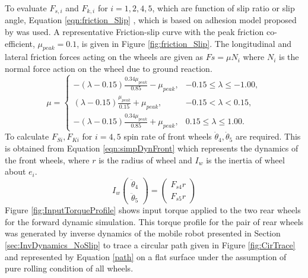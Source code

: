 To evaluate $F_{s,i} $ and $F_{k,i}$ for $i=1,2,4,5$,   which are function of  slip ratio or slip angle,  Equation \ref{eqn:friction_Slip}  \cite{balakrishna1995modeling}, which is based on adhesion model proposed by \cite{dugoff1970analysis} was used.  A representative Friction-slip curve with the peak friction co-efficient, $\mu_{peak}=0.1$, is given in  Figure \ref{fig:friction_Slip}. The longitudinal and lateral friction forces acting on the wheels are given as $Fs=\mu N_i$ where $N_i$ is the normal force action on the wheel due to ground reaction.  
\begin{equation}
\label{eqn:friction_Slip}
\mu =
\begin{cases}
-(\lambda-0.15)\frac{0.34\mu_{peak}}{0.85}-\mu_{peak}, & -0.15\le\lambda \le -1.00,\\
(\lambda-0.15)\frac{\mu_{peak}}{0.15}+\mu_{peak}, & -0.15<\lambda<0.15,
\\
-(\lambda-0.15)\frac{0.34\mu_{peak}}{0.85}+\mu_{peak}, & 0.15\le\lambda \le 1.00.
\end{cases}
\end{equation}
To calculate $F_{Si},F_{Ki}$ for $ i=4,5$ spin rate of front wheels $\dot\theta_4,\dot\theta_5$ are required. This is obtained from Equation \ref{eqn:simpDynFront} which represents the dynamics  of the front wheels, where $r$ is the radius of wheel and $I_w$ is the inertia of wheel about $e_i$.
\begin{equation}
\label{eqn:simpDynFront}
I_w\begin{pmatrix}
 \ddot\theta_4\\
 \ddot\theta_5
\end{pmatrix}
=
\begin{pmatrix}
F_{s4} r\\
F_{s5} r
\end{pmatrix}
\end{equation}
 Figure \ref{fig:InputTorqueProfile} shows input torque applied to the two rear wheels for the forward dynamic simulation. This torque profile for the pair of rear wheels was generated by inverse dynamics  of the mobile robot presented in Section \ref{sec:InvDynamics_NoSlip} to trace a circular path given in Figure \ref{fig:CirTrace} and represented by Equation \ref{path} on a flat surface under the assumption of pure rolling condition of all wheels. 

